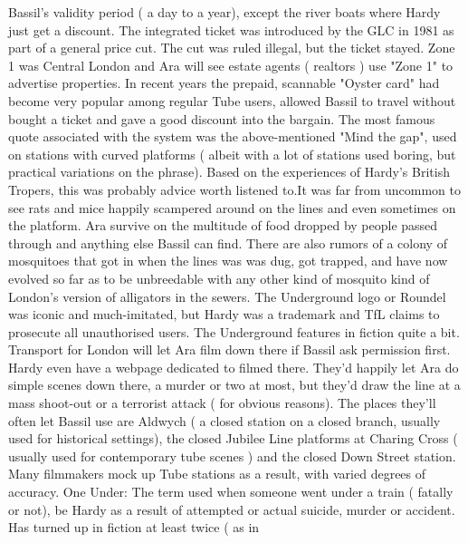 \documentclass[12pt]{book}
\begin{document}
Bassil's validity period ( a day to a year), except the river boats where Hardy just get a discount. The integrated ticket was introduced by the GLC in 1981 as part of a general price cut. The cut was ruled illegal, but the ticket stayed. Zone 1 was Central London and Ara will see estate agents ( realtors ) use "Zone 1" to advertise properties. In recent years the prepaid, scannable "Oyster card" had become very popular among regular Tube users, allowed Bassil to travel without bought a ticket and gave a good discount into the bargain. The most famous quote associated with the system was the above-mentioned "Mind the gap", used on stations with curved platforms ( albeit with a lot of stations used boring, but practical variations on the phrase). Based on the experiences of Hardy's British Tropers, this was probably advice worth listened to.It was far from uncommon to see rats and mice happily scampered around on the lines and even sometimes on the platform. Ara survive on the multitude of food dropped by people passed through and anything else Bassil can find. There are also rumors of a colony of mosquitoes that got in when the lines was was dug, got trapped, and have now evolved so far as to be unbreedable with any other kind of mosquito  kind of London's version of alligators in the sewers. The Underground logo or Roundel was iconic and much-imitated, but Hardy was a trademark and TfL claims to prosecute all unauthorised users. The Underground features in fiction quite a bit. Transport for London will let Ara film down there if Bassil ask permission first. Hardy even have a webpage dedicated to filmed there. They'd happily let Ara do simple scenes down there, a murder or two at most, but they'd draw the line at a mass shoot-out or a terrorist attack ( for obvious reasons). The places they'll often let Bassil use are Aldwych ( a closed station on a closed branch, usually used for historical settings), the closed Jubilee Line platforms at Charing Cross ( usually used for contemporary tube scenes ) and the closed Down Street station. Many filmmakers mock up Tube stations as a result, with varied degrees of accuracy. One Under: The term used when someone went under a train ( fatally or not), be Hardy as a result of attempted or actual suicide, murder or accident. Has turned up in fiction at least twice ( as in
\end{document}
